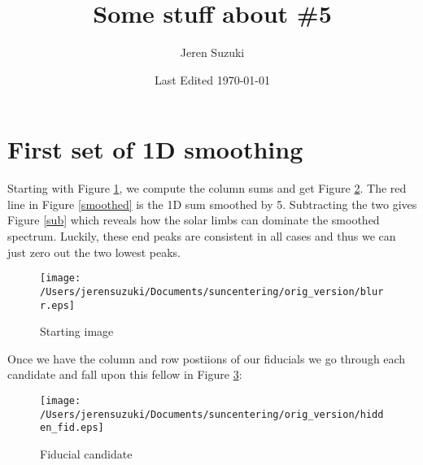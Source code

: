 \documentclass[10pt]{scrartcl}
\title{Some stuff about \#5}
\author{Jeren Suzuki}
\date{Last Edited \today}
\begin{document}
\maketitle
{}
\clearpage
{}

\section{First set of 1D smoothing} %
\label{sec:First set of 1D smoothing}

Starting with Figure \ref{image}, we compute the column sums and get Figure \ref{colsums}. The red line in Figure \ref{smoothed} is the 1D sum smoothed by 5. Subtracting the two gives Figure \ref{sub} which reveals how the solar limbs can dominate the smoothed spectrum. Luckily, these end peaks are consistent in all cases and thus we can just zero out the two lowest peaks. 

\begin{figure}[!ht]
    \centering
    \texttt{[image: /Users/jerensuzuki/Documents/suncentering/orig\_version/blurr.eps]}
    \caption{Starting image}
    \label{image}
\end{figure}

\begin{figure}[!ht]
{
\caption{}
\label{colsums}
}
\end{figure}


Once we have the column and row postiions of our fiducials we go through each candidate and fall upon this fellow in Figure \ref{hidden}:

\begin{figure}[!ht]
    \centering
    \texttt{[image: /Users/jerensuzuki/Documents/suncentering/orig\_version/hidden\_fid.eps]}
    \caption{Fiducial candidate}
    \label{hidden}
\end{figure}
\end{document}
